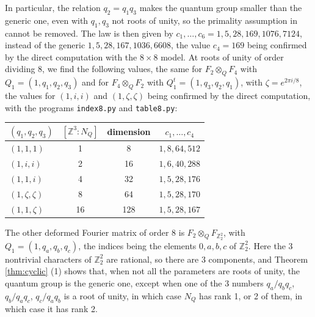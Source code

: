 \documentclass[11pt]{amsart}
\begin{document}
\noindent In particular, the relation $q_2=q_1q_3$ makes the quantum group smaller than the generic one, even with $q_1,q_3$ not roots of unity, so the primality assumption in \cite[Theorem 5.1]{bic} cannot be removed. The law is then given by $c_1,\ldots,c_6=1,5,28,169,1076,7124$, instead of the generic $1,5,28,167,1036,6608$, the value $c_4=169$ being confirmed by the direct computation with the $8\times8$ model. At roots of unity of order dividing 8, we find the following values, the same for $F_2\otimes_QF_4$ with $Q_1=(1,q_1,q_2,q_3)$ and for $F_4\otimes_QF_2$ with $Q^t_1=(1,q_3,q_2,q_1)$, with $\zeta=e^{2\pi i/8}$, the values for $(1,i,i)$ and $(1,\zeta,\zeta)$ being confirmed by the direct computation, with the programs \texttt{index8.py} and \texttt{table8.py}:

\medskip

\begin{center}
\begin{tabular}{lccc}
\toprule
$(q_1,q_2,q_3)$ & $[\mathbb Z^3:N_Q]$ & dimension & $c_1,\ldots,c_4$\\
\midrule
$(1,1,1)$ & 1 & 8 & $1,8,64,512$\\
$(1,i,i)$ & 2 & 16 & $1,6,40,288$\\
$(1,1,i)$ & 4 & 32 & $1,5,28,176$\\
$(1,\zeta,\zeta)$ & 8 & 64 & $1,5,28,170$\\
$(1,1,\zeta)$ & 16 & 128 & $1,5,28,167$\\
\bottomrule
\end{tabular}
\end{center}

\medskip

\noindent The other deformed Fourier matrix of order 8 is $F_2\otimes_QF_{\mathbb Z_2^2}$, with $Q_1=(1,q_a,q_b,q_c)$, the indices being the elements $0,a,b,c$ of $\mathbb Z_2^2$. Here the 3 nontrivial characters of $\mathbb Z_2^2$ are rational, so there are 3 components, and Theorem \ref{thm:cyclic} (1) shows that, when not all the parameters are roots of unity, the quantum group is the generic one, except when one of the 3 numbers $q_a/q_bq_c$, $q_b/q_aq_c$, $q_c/q_aq_b$ is a root of unity, in which case $N_Q$ has rank 1, or 2 of them, in which case it has rank 2.

\medskip
\end{document}
